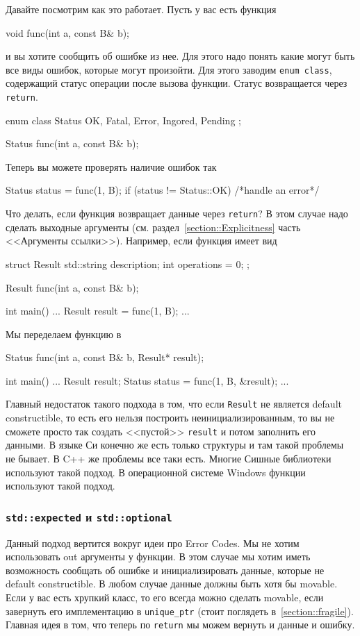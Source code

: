 Давайте посмотрим как это работает.
Пусть у вас есть функция
\begin{cppcode}
void func(int a, const B& b);
\end{cppcode}
и вы хотите сообщить об ошибке из нее.
Для этого надо понять какие могут быть все виды ошибок, которые могут произойти.
Для этого заводим \verb"enum class", содержащий статус операции после вызова функции.
Статус возвращается через \verb"return".
\begin{cppcode}
enum class Status {
  OK, Fatal, Error, Ingored, Pending
};

Status func(int a, const B& b);
\end{cppcode}
Теперь вы можете проверять наличие ошибок так
\begin{cppcode}
Status status = func(1, B{});
if (status != Status::OK) {
  /*handle an error*/
}
\end{cppcode}
Что делать, если функция возвращает данные через \verb"return"?
В этом случае надо сделать выходные аргументы (см. раздел~\ref{section::Explicitness} часть <<Аргументы ссылки>>).
Например, если функция имеет вид
\begin{cppcode}
struct Result {
  std::string description;
  int operations = 0;
};

Result func(int a, const B& b);

int main() {
  ...
  Result result = func(1, B{});
  ...
}
\end{cppcode}
Мы переделаем функцию в
\begin{cppcode}
Status func(int a, const B& b, Result* result);

int main() {
  ...
  Result result;
  Status status = func(1, B{}, &result);
  ...
}
\end{cppcode}
Главный недостаток такого подхода в том, что если \verb"Result" не является default constructible, то есть его нельзя построить неинициализированным, то вы не сможете просто так создать <<пустой>> \verb"result" и потом заполнить его данными.
В языке Си конечно же есть только структуры и там такой проблемы не бывает.
В C++ же проблемы все таки есть.
Многие Сишные библиотеки используют такой подход.
В операционной системе Windows функции используют такой подход.

\subsubsection{\texttt{std::expected} и \texttt{std::optional}}

Данный подход вертится вокруг идеи про Error Codes.
Мы не хотим использовать out аргументы у функции.
В этом случае мы хотим иметь возможность сообщать об ошибке и инициализировать данные, которые не default constructible.
В любом случае данные должны быть хотя бы movable.
Если у вас есть хрупкий класс, то его всегда можно сделать movable, если завернуть его имплементацию в \verb"unique_ptr" (стоит поглядеть в~\ref{section::fragile}).
Главная идея в том, что теперь по \verb"return" мы можем вернуть и данные и ошибку.

